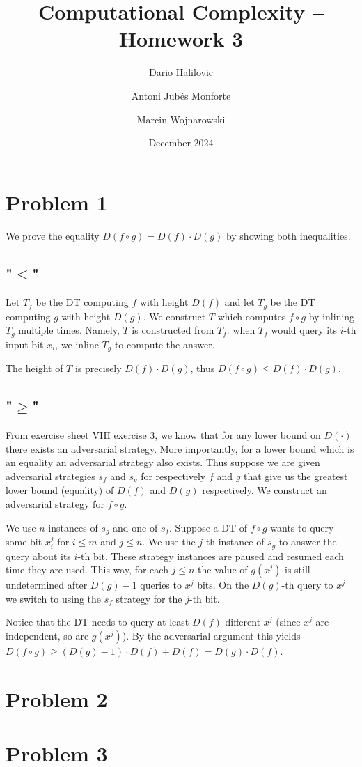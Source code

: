 \documentclass{article}
\title{Computational Complexity -- Homework 3}
\author{Dario Halilovic\and
Antoni Jubés Monforte\and
Marcin Wojnarowski}
\date{December 2024}
\begin{document}
\maketitle

\section*{Problem 1}

We prove the equality $D(f \circ g) = D(f) \cdot D(g)$ by showing both inequalities.

\subsection*{"$\le$"}

Let $T_f$ be the DT computing $f$ with height $D(f)$ and let $T_g$ be the DT computing $g$ with height $D(g)$. We construct $T$ which computes $f \circ g$ by inlining $T_g$ multiple times. Namely, $T$ is constructed from $T_f$: when $T_f$ would query its $i$-th input bit $x_i$, we inline $T_g$ to compute the answer.

The height of $T$ is precisely $D(f) \cdot D(g)$, thus $D(f \circ g) \le D(f) \cdot D(g)$.

\subsection*{"$\ge$"}

From exercise sheet VIII exercise 3, we know that for any lower bound on $D(\cdot)$ there exists an adversarial strategy. More importantly, for a lower bound which is an equality an adversarial strategy also exists. Thus suppose we are given adversarial strategies $s_f$ and $s_g$ for respectively $f$ and $g$ that give us the greatest lower bound (equality) of $D(f)$ and $D(g)$ respectively. We construct an adversarial strategy for $f \circ g$.

We use $n$ instances of $s_g$ and one of $s_f$. Suppose a DT of $f \circ g$ wants to query some bit $x_i^j$ for $i \le m$ and $j \le n$. We use the $j$-th instance of $s_g$ to answer the query about its $i$-th bit. These strategy instances are paused and resumed each time they are used. This way, for each $j \le n$ the value of $g(x^j)$ is still undetermined after $D(g)-1$ queries to $x^j$ bits. On the $D(g)$-th query to $x^j$ we switch to using the $s_f$ strategy for the $j$-th bit.

Notice that the DT needs to query at least $D(f)$ different $x^j$ (since $x^j$ are independent, so are $g(x^j)$). By the adversarial argument this yields $D(f \circ g) \ge (D(g) - 1) \cdot D(f) + D(f) = D(g) \cdot D(f)$.

\section*{Problem 2}

\section*{Problem 3}
\end{document}
